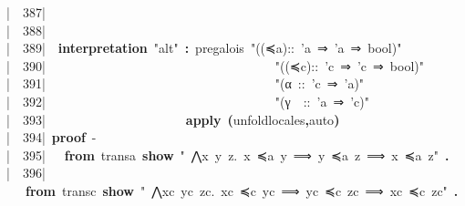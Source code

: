 \documentclass{article}
\newcommand{\syntaxKEYWORDA}[1]{\textcolor[rgb]{0.0,0.4,0.6}{\textbf{#1}}}
\newcommand{\syntaxKEYWORDC}[1]{\textcolor[rgb]{0.0,0.6,1.0}{\textbf{#1}}}
\newcommand{\syntaxLITERALA}[1]{\textcolor[rgb]{1.0,0.0,0.8}{#1}}
\newcommand{\syntaxOPERATOR}[1]{\textcolor[rgb]{0.0,0.0,0.0}{\textbf{#1}}}
\newcommand{\syntaxKEYWORDA}[1]{\textcolor[rgb]{0.0,0.4,0.6}{\textbf{#1}}}
\newcommand{\syntaxKEYWORDC}[1]{\textcolor[rgb]{0.0,0.6,1.0}{\textbf{#1}}}
\newcommand{\syntaxLITERALA}[1]{\textcolor[rgb]{1.0,0.0,0.8}{#1}}
\newcommand{\syntaxOPERATOR}[1]{\textcolor[rgb]{0.0,0.0,0.0}{\textbf{#1}}}
\newcommand{\syntaxKEYWORDA}[1]{\textcolor[rgb]{0.0,0.4,0.6}{\textbf{#1}}}
\newcommand{\syntaxKEYWORDC}[1]{\textcolor[rgb]{0.0,0.6,1.0}{\textbf{#1}}}
\newcommand{\syntaxLITERALA}[1]{\textcolor[rgb]{1.0,0.0,0.8}{#1}}
\newcommand{\syntaxOPERATOR}[1]{\textcolor[rgb]{0.0,0.0,0.0}{\textbf{#1}}}
\newcommand{\syntaxKEYWORDA}[1]{\textcolor[rgb]{0.0,0.4,0.6}{#1}}
\newcommand{\syntaxKEYWORDC}[1]{\textcolor[rgb]{0.0,0.6,1.0}{#1}}
\newcommand{\syntaxLITERALA}[1]{\textcolor[rgb]{1.0,0.0,0.8}{\textbf{#1}}}
\newcommand{\syntaxOPERATOR}[1]{\textcolor[rgb]{0.0,0.0,0.0}{#1}}
\newcommand{\syntaxKEYWORDA}[1]{\textcolor[rgb]{0.0,0.4,0.6}{\textbf{#1}}}
\newcommand{\syntaxKEYWORDC}[1]{\textcolor[rgb]{0.0,0.6,1.0}{\textbf{#1}}}
\newcommand{\syntaxLITERALA}[1]{\textcolor[rgb]{1.0,0.0,0.8}{#1}}
\newcommand{\syntaxOPERATOR}[1]{\textcolor[rgb]{0.0,0.0,0.0}{\textbf{#1}}}
\newcommand{\syntaxKEYWORDA}[1]{\textcolor[rgb]{0.0,0.4,0.6}{\textbf{#1}}}
\newcommand{\syntaxKEYWORDC}[1]{\textcolor[rgb]{0.0,0.6,1.0}{\textbf{#1}}}
\newcommand{\syntaxLITERALA}[1]{\textcolor[rgb]{1.0,0.0,0.8}{#1}}
\newcommand{\syntaxOPERATOR}[1]{\textcolor[rgb]{0.0,0.0,0.0}{\textbf{#1}}}
\newcommand{\syntaxKEYWORDA}[1]{\textcolor[rgb]{0.0,0.0,0.0}{#1}}
\newcommand{\syntaxKEYWORDC}[1]{\textcolor[rgb]{0.0,0.0,0.0}{#1}}
\newcommand{\gutter}[1]{\textcolor[rgb]{0,0,0}{{|}#1}}
\newcommand{\gutterH}[1]{\textcolor[rgb]{1,0,0}{{|}#1}}
\begin{document}
\gutter{\ \ 387{|}\ }{\ }{\ }{\ }\hspace*{\fill}\\
\gutter{\ \ 388{|}\ }{\ }{\ }{\ }{\ }\hspace*{\fill}\\
\gutter{\ \ 389{|}\ }{\ }\syntaxKEYWORDA{interpretation}{\ }\syntaxLITERALA{"alt"}{\ }\syntaxOPERATOR{:}{\ }pre\usebox{\underscorebox}galois{\ }\syntaxLITERALA{"((≼a)::{\ }'a{\ }⇒{\ }'a{\ }⇒{\ }bool)"}\hspace*{\fill}\\
\gutterH{\ \ 390{|}\ }{\ }{\ }{\ }{\ }{\ }{\ }{\ }{\ }{\ }{\ }{\ }{\ }{\ }{\ }{\ }{\ }{\ }{\ }{\ }{\ }{\ }{\ }{\ }{\ }{\ }{\ }{\ }{\ }{\ }{\ }{\ }{\ }{\ }{\ }{\ }\syntaxLITERALA{"((≼c)::{\ }'c{\ }⇒{\ }'c{\ }⇒{\ }bool)"}{\ }{\ }\hspace*{\fill}\\
\gutter{\ \ 391{|}\ }{\ }{\ }{\ }{\ }{\ }{\ }{\ }{\ }{\ }{\ }{\ }{\ }{\ }{\ }{\ }{\ }{\ }{\ }{\ }{\ }{\ }{\ }{\ }{\ }{\ }{\ }{\ }{\ }{\ }{\ }{\ }{\ }{\ }{\ }{\ }\syntaxLITERALA{"(α{\ }::{\ }'c{\ }⇒{\ }'a)"}{\ }{\ }{\ }{\ }{\ }{\ }{\ }{\ }{\ }\hspace*{\fill}\\
\gutter{\ \ 392{|}\ }{\ }{\ }{\ }{\ }{\ }{\ }{\ }{\ }{\ }{\ }{\ }{\ }{\ }{\ }{\ }{\ }{\ }{\ }{\ }{\ }{\ }{\ }{\ }{\ }{\ }{\ }{\ }{\ }{\ }{\ }{\ }{\ }{\ }{\ }{\ }\syntaxLITERALA{"(γ{\ }{\ }::{\ }'a{\ }⇒{\ }'c)"}{\ }\hspace*{\fill}\\
\gutter{\ \ 393{|}\ }{\ }{\ }{\ }{\ }{\ }{\ }{\ }{\ }{\ }{\ }{\ }{\ }{\ }{\ }{\ }{\ }{\ }{\ }{\ }{\ }{\ }\syntaxKEYWORDA{apply}{\ }\syntaxOPERATOR{(}unfold\usebox{\underscorebox}locales\syntaxOPERATOR{,}auto\syntaxOPERATOR{)}\hspace*{\fill}\\
\gutter{\ \ 394{|}\ }\syntaxKEYWORDA{proof}{\ }{-}\hspace*{\fill}\\
\gutterH{\ \ 395{|}\ }{\ }{\ }\syntaxKEYWORDA{from}{\ }transa{\ }\syntaxKEYWORDC{show}{\ }\syntaxLITERALA{"{\ }⋀x{\ }y{\ }z.{\ }x{\ }≼a{\ }y{\ }⟹{\ }y{\ }≼a{\ }z{\ }⟹{\ }x{\ }≼a{\ }z"}{\ }\syntaxKEYWORDA{.}\hspace*{\fill}\\
\gutter{\ \ 396{|}\ }{\ }{\ }\syntaxKEYWORDA{from}{\ }transc{\ }\syntaxKEYWORDC{show}{\ }\syntaxLITERALA{"{\ }⋀xc{\ }yc{\ }zc.{\ }xc{\ }≼c{\ }yc{\ }⟹{\ }yc{\ }≼c{\ }zc{\ }⟹{\ }xc{\ }≼c{\ }zc"}{\ }\syntaxKEYWORDA{.}\hspace*{\fill}\\
\end{document}
